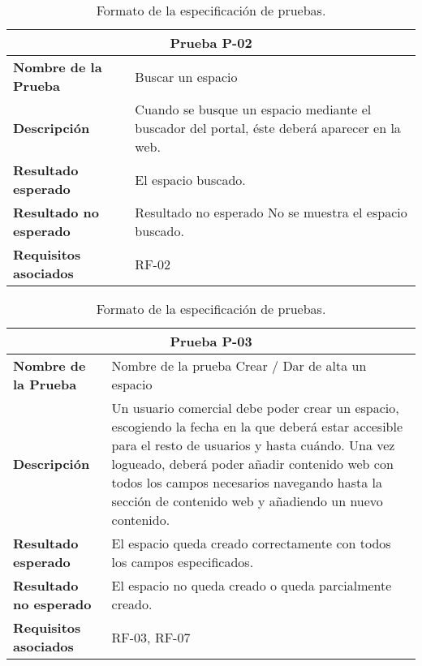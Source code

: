 \begin{table}[h]
\begin{center}
\begin{tabular}{ l l }
\multicolumn{2}{c}{Prueba P-02} \\ \hline
\textbf{Nombre de la Prueba} & Buscar un espacio \\
\textbf{Descripción} & Cuando se busque un espacio mediante el buscador del portal, éste deberá aparecer en la web. \\
\textbf{Resultado esperado} & El espacio buscado. \\
\textbf{Resultado no esperado} & Resultado no esperado	No se muestra el espacio buscado. \\
\textbf{Requisitos asociados} & RF-02\\ \hline
\end{tabular}
\caption{Formato de la especificación de pruebas.}
\label{tab:P2}
\end{center}
\end{table}

\begin{table}[h]
\begin{center}
\begin{tabular}{ l l }
\multicolumn{2}{c}{Prueba P-03} \\ \hline
\textbf{Nombre de la Prueba} & Nombre de la prueba	Crear / Dar de alta un espacio \\
\textbf{Descripción} & Un usuario comercial debe poder crear un espacio, escogiendo la fecha en la que deberá estar accesible para el resto de usuarios y hasta cuándo. Una vez logueado, deberá poder añadir contenido web con todos los campos necesarios navegando hasta la sección de contenido web y añadiendo un nuevo contenido. \\
\textbf{Resultado esperado} & El espacio queda creado correctamente con todos los campos especificados. \\
\textbf{Resultado no esperado} & El espacio no queda creado o queda parcialmente creado. \\
\textbf{Requisitos asociados} & RF-03, RF-07 \\ \hline
\end{tabular}
\caption{Formato de la especificación de pruebas.}
\label{tab:P3}
\end{center}
\end{table}

